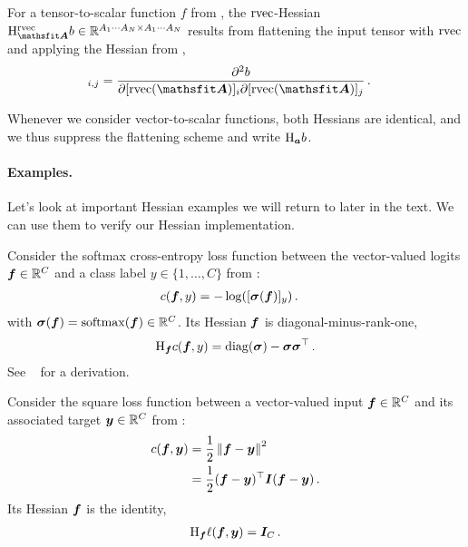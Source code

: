 \begin{definition}\label{def:rvec_hessian}
  For a tensor-to-scalar function $f$ from , the $\operatorname{rvec}$-Hessian $\hess_{\tA}^{\rvec}b \in \sR^{A_1 \cdots A_N \times A_1 \cdots A_N}$ results from flattening the input tensor with $\operatorname{rvec}$ and applying the Hessian from ,
  \begin{align*}
    [\hess^{\rvec}_{\tA}b]_{i, j}
     & =
    \frac{\partial^2 b}{\partial [\rvec(\tA)]_{i} \partial [\rvec(\tA)]_{j}}\,.
  \end{align*}
\end{definition}

Whenever we consider vector-to-scalar functions, both Hessians are identical, and we thus suppress the flattening scheme and write $\mathrm{H}_{{\bm{a}}}b$.

\paragraph{Examples.}
Let's look at important Hessian examples we will return to later in the text.
We can use them to verify our Hessian implementation.

\switchcolumn[1]
\switchcolumn[0]

\begin{example}\label{ex:hessian-crossentropyloss}
  Consider the softmax cross-entropy loss function between the vector-valued logits ${\bm{f}} \in {\mathbb{R}}^C$ and a class label $y \in \{1, \dots, C\}$ from :
  \begin{align*}
    c({\bm{f}}, y)
     & =
    -\log([{\bm{\sigma}}({\bm{f}})]_y)\,.
  \end{align*}
  with ${\bm{\sigma}}({\bm{f}}) = \mathrm{softmax}({\bm{f}}) \in {\mathbb{R}}^C$.
  Its Hessian \wrt ${\bm{f}}$ is diagonal-minus-rank-one,
  \begin{align*}
    \mathrm{H}_{{\bm{f}}} c({\bm{f}}, y)
    =
    \operatorname{diag}({\bm{\sigma}}) - {\bm{\sigma}} {\bm{\sigma}}^\top\,.
  \end{align*}
  See \eg~\citet{dangel2020modular} for a derivation.
\end{example}

\switchcolumn[1]

\switchcolumn[0]
\begin{example}\label{ex:square_loss_hessian}
  Consider the square loss function between a vector-valued input ${\bm{f}} \in {\mathbb{R}}^C$ and its associated target ${\bm{y}} \in {\mathbb{R}}^C$ from :
  \begin{align*}
    c({\bm{f}}, {\bm{y}})
     & =
    \frac{1}{2}\left\lVert
    {\bm{f}} - {\bm{y}}
    \right\rVert^2
    \\
     & =
    \frac{1}{2}({\bm{f}} - {\bm{y}})^{\top} {\bm{I}} ({\bm{f}} - {\bm{y}})\,.
  \end{align*}
  Its Hessian \wrt ${\bm{f}}$ is the identity,
  \begin{align*}
    \mathrm{H}_{{\bm{f}}} \ell({\bm{f}}, {\bm{y}})
    =
    {\bm{I}}_C\,.
  \end{align*}
\end{example}

